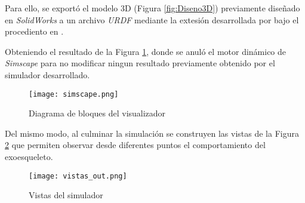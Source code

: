     Para ello, se exportó el modelo 3D (Figura \ref{fig:Diseno3D}) previamente diseñado en \emph{SolidWorks} a un archivo
    \emph{URDF} \cite{urdf} mediante la extesión desarrollada por \cite{sw2urdf} bajo el procediento en \cite{import_urdf}. 

    Obteniendo el resultado de la Figura \ref{fig:visualizador}, donde se anuló el motor dinámico de 
    \emph{Simscape} para no modificar ningun resultado previamente obtenido por el simulador desarrollado.
    \begin{figure}[H]
        \texttt{[image: simscape.png]}
        \centering
        \caption{Diagrama de bloques del visualizador}
        \label{fig:visualizador}
    \end{figure}
    Del mismo modo, al culminar la simulación se construyen las vistas de la Figura \ref{fig:vistas} que permiten observar desde diferentes
    puntos el comportamiento del exoesqueleto. 
    \begin{figure}[h]
        \texttt{[image: vistas\_out.png]}
        \centering
        \caption{ Vistas del simulador }
        \label{fig:vistas}
    \end{figure}
    
    